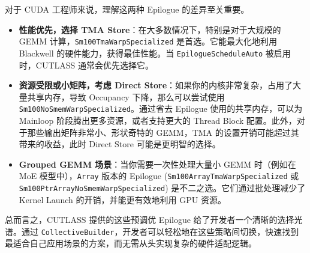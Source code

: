 对于 CUDA 工程师来说，理解这两种 Epilogue 的差异至关重要。

\begin{itemize}
\item \textbf{性能优先，选择 TMA Store}：在大多数情况下，特别是对于大规模的 GEMM 计算，\texttt{Sm100\allowbreak{}Tma\allowbreak{}Warp\allowbreak{}Specialized} 是首选。它能最大化地利用 Blackwell 的硬件能力，获得最佳性能。当 \texttt{Epilogue\allowbreak{}Schedule\allowbreak{}Auto} 被启用时，CUTLASS 通常会优先选择它。
\item \textbf{资源受限或小矩阵，考虑 Direct Store}：如果你的内核非常复杂，占用了大量共享内存，导致 Occupancy 下降，那么可以尝试使用 \texttt{S\allowbreak{}m\allowbreak{}1\allowbreak{}0\allowbreak{}0\allowbreak{}N\allowbreak{}o\allowbreak{}S\allowbreak{}m\allowbreak{}e\allowbreak{}m\allowbreak{}W\allowbreak{}a\allowbreak{}r\allowbreak{}p\allowbreak{}S\allowbreak{}p\allowbreak{}e\allowbreak{}c\allowbreak{}i\allowbreak{}a\allowbreak{}l\allowbreak{}i\allowbreak{}z\allowbreak{}e\allowbreak{}d}。通过省去 Epilogue 使用的共享内存，可以为 Mainloop 阶段腾出更多资源，或者支持更大的 Thread Block 配置。此外，对于那些输出矩阵非常小、形状奇特的 GEMM，TMA 的设置开销可能超过其带来的收益，此时 Direct Store 可能是更明智的选择。
\item \textbf{Grouped GEMM 场景}：当你需要一次性处理大量小 GEMM 时（例如在 Mo\allowbreak{}E 模型中），\texttt{Array} 版本的 Epilogue (\texttt{S\allowbreak{}m\allowbreak{}1\allowbreak{}0\allowbreak{}0\allowbreak{}A\allowbreak{}r\allowbreak{}r\allowbreak{}a\allowbreak{}y\allowbreak{}T\allowbreak{}m\allowbreak{}a\allowbreak{}W\allowbreak{}a\allowbreak{}r\allowbreak{}p\allowbreak{}S\allowbreak{}p\allowbreak{}e\allowbreak{}c\allowbreak{}i\allowbreak{}a\allowbreak{}l\allowbreak{}i\allowbreak{}z\allowbreak{}e\allowbreak{}d} 或 \texttt{S\allowbreak{}m\allowbreak{}1\allowbreak{}0\allowbreak{}0\allowbreak{}P\allowbreak{}t\allowbreak{}r\allowbreak{}A\allowbreak{}r\allowbreak{}r\allowbreak{}a\allowbreak{}y\allowbreak{}N\allowbreak{}o\allowbreak{}S\allowbreak{}m\allowbreak{}e\allowbreak{}m\allowbreak{}W\allowbreak{}a\allowbreak{}r\allowbreak{}p\allowbreak{}S\allowbreak{}p\allowbreak{}e\allowbreak{}c\allowbreak{}i\allowbreak{}a\allowbreak{}l\allowbreak{}i\allowbreak{}z\allowbreak{}e\allowbreak{}d}) 是不二之选。它们通过批处理减少了 Kernel Launch 的开销，并能更有效地利用 GPU 资源。
\end{itemize}

总而言之，CUTLASS 提供的这些预调优 Epilogue 给了开发者一个清晰的选择光谱。通过 \texttt{Collective\allowbreak{}Builder}，开发者可以轻松地在这些策略间切换，快速找到最适合自己应用场景的方案，而无需从头实现复杂的硬件适配逻辑。

